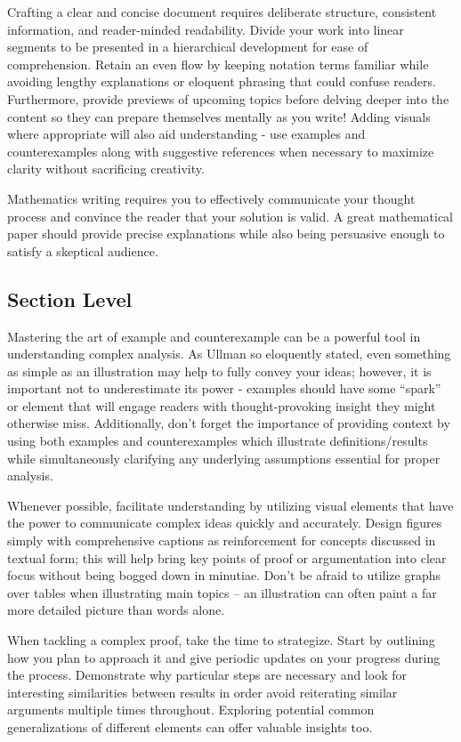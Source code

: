 \documentclass[
  twoside,
  12pt,
  letterpaper,
  fleqn]{article}
\begin{document}
Crafting a clear and concise document requires deliberate structure,
consistent information, and reader-minded readability. Divide your work
into linear segments to be presented in a hierarchical development for
ease of comprehension. Retain an even flow by keeping notation terms
familiar while avoiding lengthy explanations or eloquent phrasing that
could confuse readers. Furthermore, provide previews of upcoming topics
before delving deeper into the content so they can prepare themselves
mentally as you write! Adding visuals where appropriate will also aid
understanding - use examples and counterexamples along with suggestive
references when necessary to maximize clarity without sacrificing
creativity.

Mathematics writing requires you to effectively communicate your thought
process and convince the reader that your solution is valid. A great
mathematical paper should provide precise explanations while also being
persuasive enough to satisfy a skeptical audience.

\hypertarget{section-level}{%
\subsection{Section Level}\label{section-level}}

Mastering the art of example and counterexample can be a powerful tool
in understanding complex analysis. As Ullman so eloquently stated, even
something as simple as an illustration may help to fully convey your
ideas; however, it is important not to underestimate its power -
examples should have some ``spark'' or element that will engage readers
with thought-provoking insight they might otherwise miss. Additionally,
don't forget the importance of providing context by using both examples
and counterexamples which illustrate definitions/results while
simultaneously clarifying any underlying assumptions essential for
proper analysis.

Whenever possible, facilitate understanding by utilizing visual elements
that have the power to communicate complex ideas quickly and accurately.
Design figures simply with comprehensive captions as reinforcement for
concepts discussed in textual form; this will help bring key points of
proof or argumentation into clear focus without being bogged down in
minutiae. Don't be afraid to utilize graphs over tables when
illustrating main topics -- an illustration can often paint a far more
detailed picture than words alone.

When tackling a complex proof, take the time to strategize. Start by
outlining how you plan to approach it and give periodic updates on your
progress during the process. Demonstrate why particular steps are
necessary and look for interesting similarities between results in order
avoid reiterating similar arguments multiple times throughout. Exploring
potential common generalizations of different elements can offer
valuable insights too.
\end{document}
